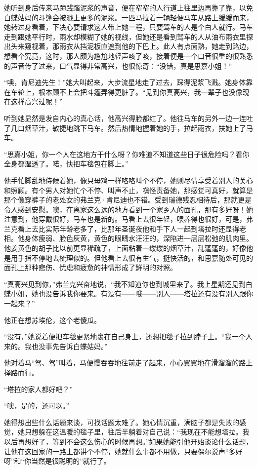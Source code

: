 \par 她听到身后传来马蹄践踏泥浆的声音，便在窄窄的人行道上往里边再靠了靠，以免白蝶姑妈的斗篷会被溅上更多的泥浆。一匹马拉着一辆轻便马车从路上缓缓而来，她转过身看着，下决心要请求这人带上她一程，只要驾车的人是个白人就行。马车走到跟她平行时，雨水却模糊了她的视线，但她还是看到驾车的人从油布雨衣里探出头来窥视着，那雨衣从挡泥板直遮到他的下巴上。此人有点面熟，她走到路边，想看个究竟，这时，那人颇为尴尬地轻声咳了咳，接着便是一个口音很重的很熟悉的声音传了过来，口气显得非常高兴，也很惊奇：“没错，真是思嘉小姐！”
\par “噢，肯尼迪先生！”她大叫起来，大步流星地走了过去，踩得泥浆飞溅。她身体靠在车轮上，根本顾不上会把斗篷弄得更脏了。“见到你真高兴，我一辈子也没像现在这样高兴过呢！”
\par 听到她显然是发自内心的真心话，他高兴得脸都红了。他往马车的另外一边一连吐了几口烟草汁，敏捷地跳下马车。然后热情地握着她的手，拉起雨衣，扶她上了马车。
\par “思嘉小姐，你一个人在这地方干什么呀？你难道不知道这些日子很危险吗？看你全身都湿透了。喏，快把车毯包在脚上。”
\par 他手忙脚乱地侍候着她，像只母鸡一样咯咯叫个不停，她则尽情享受着别人的关心和照顾。有个男人对她忙个不停、叫声不止，嗔怪责备她，那感觉可真好，就算是那个像穿裤子的老处女的弗兰克·肯尼迪也不错。受到瑞德残忍相待后，那就更是令人感到安慰。噢，在离家这么远的地方看到一个家乡人的面孔，那有多好呀！她注意到，他穿戴很好，马车也是新的。马看上去很年轻，喂养得也很好，可是，弗兰克看上去比实际年龄老多了，比那年圣诞夜他和手下人一起到塔拉时还显得老相。他身体瘦弱、脸色灰黄，黄色的眼睛水汪汪的，深陷进一层层松弛的肌肉里。他姜黄色的胡子比以前更显稀疏了，上面粘着一缕缕的烟草汁，乱蓬蓬的，好像他是用手指不停地去梳理似的。但他看上去很有生气，挺快活的，和思嘉随处可见的面孔上那种悲伤、忧虑和疲惫的神情形成了鲜明的对照。
\par “真高兴见到你，”弗兰克兴奋地说，“我不知道你也到城里来了。我上星期还见到白蝶小姐，她也没告诉我你要来。有没有——哦——别人——塔拉还有没有别人跟你一起来？”
\par 他正在想苏埃伦，这个老傻瓜。
\par “没有，”她说着便把车毯更紧地裹在自己身上，还想把毯子拉到脖子上。“我一个人来的。我也没事先告诉白蝶姑妈。”
\par 他对着马“驾、驾”叫着，马便慢吞吞地往前走了起来，小心翼翼地在滑溜溜的路上择路而行。
\par “塔拉的家人都好吧？”
\par “噢，是的，还可以。”
\par 她得想出些什么话题来谈，可找话题太难了。她心情沉重，满脑子都是失败的感觉，她只想躲在这温暖的毯子里，往后半躺着对自己说：“我现在不能想塔拉。我以后再想好了，等到不会这么伤心的时候再想。”如果她能引他开始谈论什么话题，让他在这回家的一路上都讲个不停，她就什么事都不用做，只要偶尔说声“多好呀”和“你当然是很聪明的”就行了。
